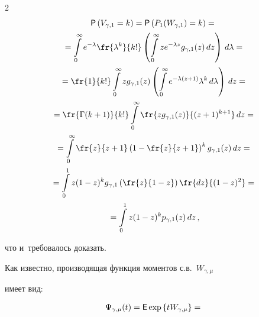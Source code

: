 \begin{multicols}{2}
\begin{multline*}


{\sf P}\left(V_{\gamma,1}=k\right)={\sf P}


\left(P_1(W_{\gamma,1})=k\right)={}\\[1pt]


{}=\int\limits_{0}^{\infty}e^{-\lambda}


\fr{\lambda^k}{k!}\left(\int\limits_{0}^{\infty} ze^{-\lambda z}


g_{\gamma,1}(z)\,dz\right)\,d\lambda={}


\\[1pt]


{}=\fr{1}{k!}\int\limits_{0}^{\infty}


zg_{\gamma,1}(z)\left(


\int\limits_{0}^{\infty}e^{-\lambda(z+1)}\lambda^k\,d\lambda\right)\,dz={}\\[1pt]


{}=


\fr{\Gamma(k+1)}{k!}\int\limits_{0}^{\infty}\fr{zg_{\gamma,1}(z)}{(z+1)^{k+1}}\,dz={}


\\[1pt]


{}=\int\limits_{0}^{\infty}\fr{z}{z+1}\left(1-\fr{z}{z+1}\right)^kg_{\gamma,1}(z)\,dz={}\\[1pt]


{}=


\int\limits_{0}^{1}z(1-z)^k g_{\gamma,1}\left(


\fr{z}{1-z}\right)\fr{dz}{(1-z)^{2}}={}\\[1pt]


{}=\int\limits_{0}^{1}z(1-z)^kp_{\gamma,1}(z)\,dz\,,


\end{multline*}


что и~требовалось доказать.





\smallskip





Как известно, производящая функция моментов с.в.~$W_{\gamma,\mu}$


имеет вид:


\begin{multline*}


\hspace*{-1.18353pt}\Psi_{\gamma,\mu}(t)={\sf E}


\exp\left\{tW_{\gamma,\mu}\right\}=



\end{multline*}
\end{multicols}
